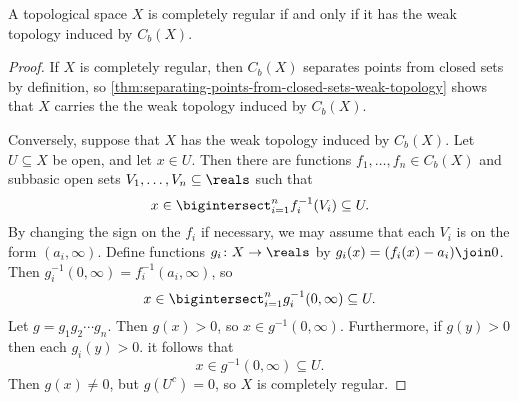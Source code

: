 \documentclass[article, a4paper, 11pt, oneside]{memoir}
\numberwithin{equation}{chapter}
\newcommand{\preim}{^{-1}}
\begin{document}
\begin{theorem}
    \label{thm:completely-regular-weak-topology}
    A topological space $X$ is completely regular if and only if it has the weak topology induced by $C_b(X)$.
\end{theorem}

\begin{proof}
    If $X$ is completely regular, then $C_b(X)$ separates points from closed sets by definition, so \cref{thm:separating-points-from-closed-sets-weak-topology} shows that $X$ carries the the weak topology induced by $C_b(X)$.

    Conversely, suppose that $X$ has the weak topology induced by $C_b(X)$. Let $U \subseteq X$ be open, and let $x \in U$. Then there are functions $f_1, \ldots, f_n \in C_b(X)$ and subbasic open sets $V_1, \ldots, V_n \subseteq \reals$ such that
    \begin{equation*}
        x
            \in \bigintersect_{i=1}^n f_i\preim(V_i)
            \subseteq U.
    \end{equation*}
    By changing the sign on the $f_i$ if necessary, we may assume that each $V_i$ is on the form $(a_i, \infty)$. Define functions $g_i \colon X \to \reals$ by $g_i(x) = (f_i(x) - a_i) \join 0$. Then $g_i\preim(0,\infty) = f_i\preim(a_i,\infty)$, so
    \begin{equation*}
        x
            \in \bigintersect_{i=1}^n g_i\preim(0,\infty)
            \subseteq U.
    \end{equation*}
    Let $g = g_1 g_2 \cdots g_n$. Then $g(x) > 0$, so $x \in g\preim(0,\infty)$. Furthermore, if $g(y) > 0$ then each $g_i(y) > 0$. it follows that
    \begin{equation*}
        x
            \in g\preim(0,\infty)
            \subseteq U.
    \end{equation*}
    Then $g(x) \neq 0$, but $g(U^c) = 0$, so $X$ is completely regular.
\end{proof}



    
\end{document}

